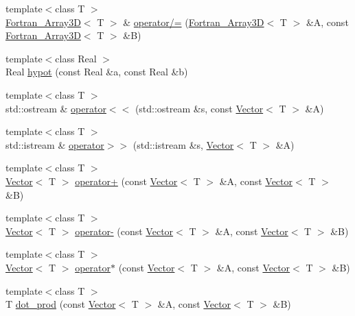 \begin{DoxyCompactItemize}
\item 
{\footnotesize template$<$class T $>$ }\\\hyperlink{classTNT_1_1Fortran__Array3D}{Fortran\-\_\-\-Array3\-D}$<$ T $>$ \& \hyperlink{namespaceTNT_ae288b6afc4faaa8b3a6bc1a14c4c42b4}{operator/=} (\hyperlink{classTNT_1_1Fortran__Array3D}{Fortran\-\_\-\-Array3\-D}$<$ T $>$ \&A, const \hyperlink{classTNT_1_1Fortran__Array3D}{Fortran\-\_\-\-Array3\-D}$<$ T $>$ \&B)
\item 
{\footnotesize template$<$class Real $>$ }\\Real \hyperlink{namespaceTNT_ae102d1c8992a4fea1cc1b2efeabfcc66}{hypot} (const Real \&a, const Real \&b)
\item 
{\footnotesize template$<$class T $>$ }\\std\-::ostream \& \hyperlink{namespaceTNT_a20c2d998d51d92ef6a5f521c66bf8d0b}{operator$<$$<$} (std\-::ostream \&s, const \hyperlink{classTNT_1_1Vector}{Vector}$<$ T $>$ \&A)
\item 
{\footnotesize template$<$class T $>$ }\\std\-::istream \& \hyperlink{namespaceTNT_ad5d2fa6f96933cf8a6b3706a39582a64}{operator$>$$>$} (std\-::istream \&s, \hyperlink{classTNT_1_1Vector}{Vector}$<$ T $>$ \&A)
\item 
{\footnotesize template$<$class T $>$ }\\\hyperlink{classTNT_1_1Vector}{Vector}$<$ T $>$ \hyperlink{namespaceTNT_ab92825996c7ec6991d06eca11863e0c0}{operator+} (const \hyperlink{classTNT_1_1Vector}{Vector}$<$ T $>$ \&A, const \hyperlink{classTNT_1_1Vector}{Vector}$<$ T $>$ \&B)
\item 
{\footnotesize template$<$class T $>$ }\\\hyperlink{classTNT_1_1Vector}{Vector}$<$ T $>$ \hyperlink{namespaceTNT_a1be3c1e84293029bae011fb0d5c8f82a}{operator-\/} (const \hyperlink{classTNT_1_1Vector}{Vector}$<$ T $>$ \&A, const \hyperlink{classTNT_1_1Vector}{Vector}$<$ T $>$ \&B)
\item 
{\footnotesize template$<$class T $>$ }\\\hyperlink{classTNT_1_1Vector}{Vector}$<$ T $>$ \hyperlink{namespaceTNT_a6a759501941fd46aa222319403fedfc4}{operator$\ast$} (const \hyperlink{classTNT_1_1Vector}{Vector}$<$ T $>$ \&A, const \hyperlink{classTNT_1_1Vector}{Vector}$<$ T $>$ \&B)
\item 
{\footnotesize template$<$class T $>$ }\\T \hyperlink{namespaceTNT_a3a98dd3afb32d1c69826da446eb2e995}{dot\-\_\-prod} (const \hyperlink{classTNT_1_1Vector}{Vector}$<$ T $>$ \&A, const \hyperlink{classTNT_1_1Vector}{Vector}$<$ T $>$ \&B)
\end{DoxyCompactItemize}



